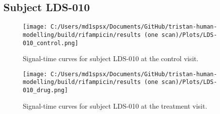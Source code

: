 \documentclass{epflreport}%
\begin{document}
\subsection{Subject LDS{-}010}%
\label{subsec:SubjectLDS{-}010}%

%


\begin{figure}[h!]%
\centering%
\texttt{[image: C:/Users/md1spsx/Documents/GitHub/tristan-human-modelling/build/rifampicin/results (one scan)/Plots/LDS-010\_control.png]}%
\caption{Signal{-}time curves for subject LDS{-}010 at the control visit.}%
\end{figure}

%


\begin{figure}[h!]%
\centering%
\texttt{[image: C:/Users/md1spsx/Documents/GitHub/tristan-human-modelling/build/rifampicin/results (one scan)/Plots/LDS-010\_drug.png]}%
\caption{Signal{-}time curves for subject LDS{-}010 at the treatment visit.}%
\end{figure}
\end{document}

